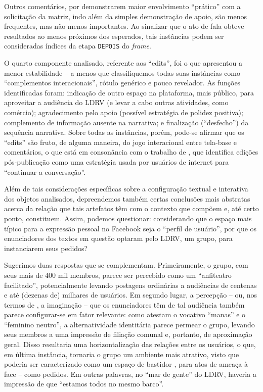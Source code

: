 \documentclass{textolivre}
\begin{document}
Outros comentários, por demonstrarem maior envolvimento “prático” com a solicitação da matriz, indo além da simples demonstração de apoio, são menos frequentes, mas não menos importantes. Ao sinalizar que o ato de fala obteve resultados ao menos próximos dos esperados, tais instâncias podem ser consideradas índices da etapa \texttt{DEPOIS} do \textit{frame}.

O quarto componente analisado, referente aos “edits”, foi o que apresentou a menor estabilidade – a menos que classifiquemos todas suas instâncias como “complementos interacionais”, rótulo genérico e pouco revelador. As funções identificadas foram: indicação de outro espaço na plataforma, mais público, para aproveitar a audiência do LDRV (e levar a cabo outras atividades, como comércio); agradecimento pelo apoio (possível estratégia de polidez positiva); complemento de informação ausente na narrativa; e finalização (“desfecho”) da sequência narrativa. Sobre todas as instâncias, porém, pode-se afirmar que os “edits” são fruto, de alguma maneira, do jogo interacional entre tela-base e comentários, o que está em consonância com o trabalho de \textcite{gallagher2015}, que identifica edições pós-publicação como uma estratégia usada por usuários de internet para “continuar a conversação”.

Além de tais considerações específicas sobre a configuração textual e interativa dos objetos analisados, depreendemos também certas conclusões mais abstratas acerca da relação que tais artefatos têm com o contexto que compõem e, até certo ponto, constituem. Assim, podemos questionar: considerando que o espaço mais típico para a expressão pessoal no Facebook seja o “perfil de usuário”, por que os enunciadores dos textos em questão optaram pelo LDRV, um grupo, para instanciarem seus pedidos?

Sugerimos duas respostas que se complementam. Primeiramente, o grupo, com seus mais de 400 mil membros, parece ser percebido como um “anfiteatro facilitado”, potencialmente levando postagens ordinárias a audiências de centenas e até (dezenas de) milhares de usuários. Em segundo lugar, a percepção – ou, nos termos de \textcite{marwick2011}, a imaginação – que os enunciadores têm de tal audiência também parece configurar-se em fator relevante: como atestam o vocativo “manas” e o “feminino neutro”, a alternatividade identitária parece permear o grupo, levando seus membros a uma impressão de filiação comunal e, portanto, de aproximação geral. Disso resultaria uma horizontalização das relações entre os usuários, o que, em última instância, tornaria o grupo um ambiente mais atrativo, visto que poderia ser caracterizado como um espaço de bastidor \cite{goffman1985}, para atos de ameaça à face – como pedidos. Em outras palavras, no “mar de gente” do LDRV, haveria a impressão de que “estamos todos no mesmo barco”.
\end{document}
